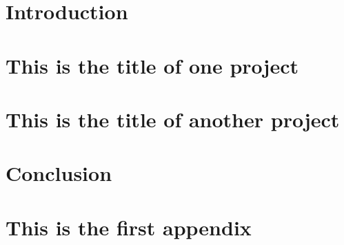 \documentclass[12pt,notitlepage]{report}
\begin{document}

\chapter{Introduction}
\label{chapter:intro}

\newpage


\chapter{This is the title of one project}
\label{chapter:chapter_2}


\newpage

\chapter{This is the title of another project}
\label{chapter:chapter_3}


\newpage

\chapter{Conclusion}
\label{chapter:conclusion}


\newpage



\appendix %

\captionsetup[figure]{list=no}
\captionsetup[table]{list=no}

\newpage


\chapter{This is the first appendix}
\label{chapter:appendix_a}

\end{document}
